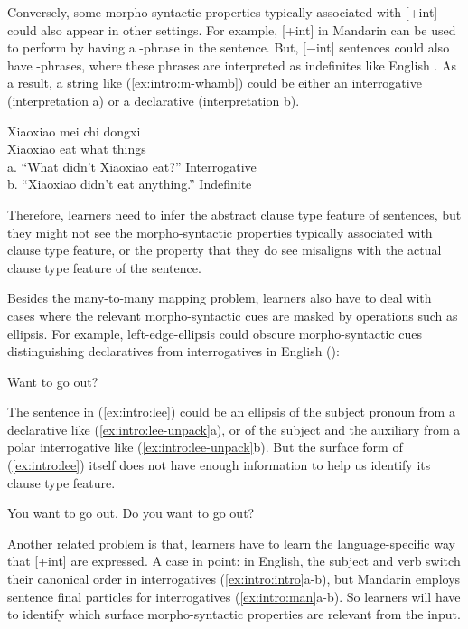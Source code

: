 Conversely, some morpho-syntactic properties typically associated with [+int] could also appear in other settings. For example, [+int] in Mandarin can be used to perform by having a \twh-phrase in the sentence. But, [$-$int] sentences could also have \twh-phrases, where these phrases are interpreted as indefinites like English . As a result, a string like (\ref{ex:intro:m-whamb}) could be either an interrogative (interpretation a) or a declarative (interpretation b). 


\gll Xiaoxiao mei 	chi 	 dongxi\\ 
Xiaoxiao \Neg{} 	eat	what	things\\
a.	``What didn’t Xiaoxiao eat?''	\hfill Interrogative \twh\\
b.	``Xiaoxiao didn’t eat anything.''		\hfill Indefinite \twh
\eex

Therefore, learners need to infer the abstract clause type feature of sentences, but they might not see the morpho-syntactic properties typically associated with clause type feature, or the property that they do see misaligns with the actual clause type feature of the sentence.

Besides the many-to-many mapping problem, learners also have to deal with cases where the relevant morpho-syntactic cues are masked by operations such as ellipsis.  For example, left-edge-ellipsis could obscure morpho-syntactic cues distinguishing declaratives from interrogatives in English (\cite{zwickypullum1983leftedge}):

Want to go out?
\eex

The sentence in (\ref{ex:intro:lee}) could be an ellipsis of  the subject pronoun from a declarative like (\ref{ex:intro:lee-unpack}a), or of the subject and the auxiliary from a polar interrogative like (\ref{ex:intro:lee-unpack}b). But the surface form of (\ref{ex:intro:lee}) itself does not have enough information to help us identify its clause type feature. 

\bxl
You want to go out.
\ex Do you want to go out?
\exl
\eex


Another related problem is that, learners have to learn the language-specific way that [+int] are expressed. A case in point: in English, the subject and verb switch their canonical order in interrogatives (\ref{ex:intro:intro}a-b), but Mandarin employs sentence final particles for interrogatives (\ref{ex:intro:man}a-b). So learners will have to identify which surface morpho-syntactic properties are relevant from the input.  

